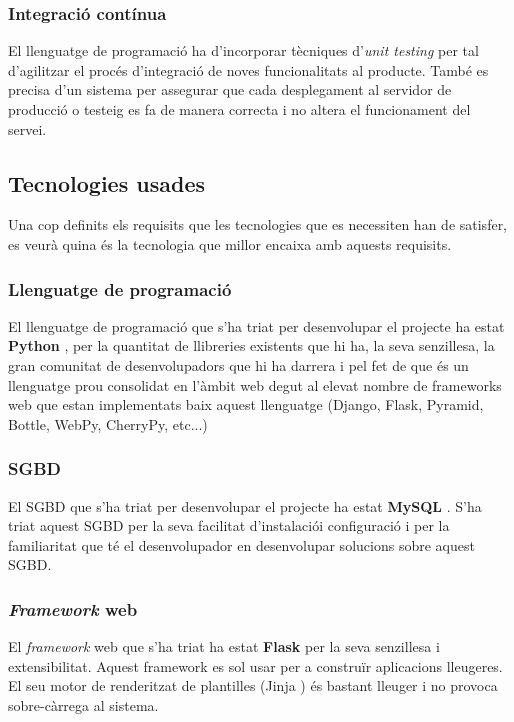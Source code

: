 	\subsubsection{Integració contínua}
	El llenguatge de programació ha d'incorporar tècniques d'\emph{unit testing} per tal d'agilitzar el procés d'integració de noves funcionalitats al producte. També es precisa d'un sistema per assegurar que cada desplegament al servidor de producció o testeig es fa de manera correcta i no altera el funcionament del servei.

\subsection{Tecnologies usades}
Una cop definits els requisits que les tecnologies que es necessiten han de satisfer, es veurà quina és la tecnologia que millor encaixa amb aquests requisits.

	\subsubsection{Llenguatge de programació}
	El llenguatge de programació que s'ha triat per desenvolupar el projecte ha estat \textbf{Python} \cite{python}, per la quantitat de llibreries existents que hi ha, la seva senzillesa, la gran comunitat de desenvolupadors que hi ha darrera i pel fet de que és un llenguatge prou consolidat en l'àmbit web degut al elevat nombre de frameworks web que estan implementats baix aquest llenguatge (Django, Flask, Pyramid, Bottle, WebPy, CherryPy, etc...)

	\subsubsection{\ac{SGBD}}
	El \ac{SGBD} que s'ha triat per desenvolupar el projecte ha estat \textbf{MySQL} \cite{mysql}. S'ha triat aquest \ac{SGBD} per la seva facilitat d'instalaciói configuració i per la familiaritat que té el desenvolupador en desenvolupar solucions sobre aquest \ac{SGBD}.

	\subsubsection{\emph{Framework} web}
	El \emph{framework} web que s'ha triat ha estat \textbf{Flask} \cite{flask} per la seva senzillesa i extensibilitat. Aquest framework es sol usar per a construïr aplicacions lleugeres. El seu motor de renderitzat de plantilles (Jinja \cite{jinja}) és bastant lleuger i no provoca sobre-càrrega al sistema. 

